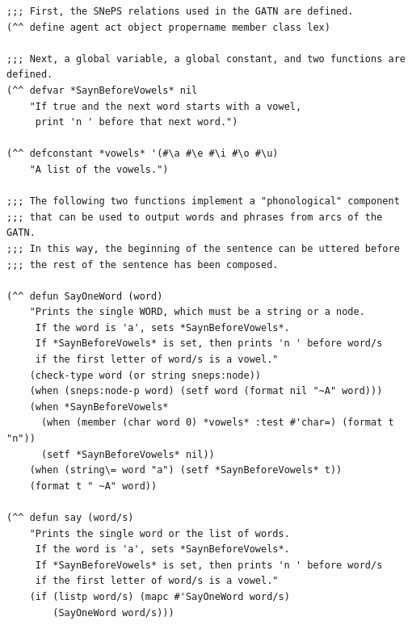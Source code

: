 \documentclass{book}
\begin{document}
\begin{verbatim}
;;; First, the SNePS relations used in the GATN are defined.
(^^ define agent act object propername member class lex)

;;; Next, a global variable, a global constant, and two functions are defined.
(^^ defvar *SaynBeforeVowels* nil
    "If true and the next word starts with a vowel,
     print 'n ' before that next word.")

(^^ defconstant *vowels* '(#\a #\e #\i #\o #\u)
    "A list of the vowels.")

;;; The following two functions implement a "phonological" component
;;; that can be used to output words and phrases from arcs of the GATN.
;;; In this way, the beginning of the sentence can be uttered before
;;; the rest of the sentence has been composed.

(^^ defun SayOneWord (word)
    "Prints the single WORD, which must be a string or a node.
     If the word is 'a', sets *SaynBeforeVowels*.
     If *SaynBeforeVowels* is set, then prints 'n ' before word/s
     if the first letter of word/s is a vowel."
    (check-type word (or string sneps:node))
    (when (sneps:node-p word) (setf word (format nil "~A" word)))
    (when *SaynBeforeVowels*
      (when (member (char word 0) *vowels* :test #'char=) (format t "n"))
      (setf *SaynBeforeVowels* nil))
    (when (string\= word "a") (setf *SaynBeforeVowels* t))
    (format t " ~A" word))

(^^ defun say (word/s)
    "Prints the single word or the list of words.
     If the word is 'a', sets *SaynBeforeVowels*.
     If *SaynBeforeVowels* is set, then prints 'n ' before word/s
     if the first letter of word/s is a vowel."
    (if (listp word/s) (mapc #'SayOneWord word/s)
        (SayOneWord word/s)))


\end{verbatim}
\end{document}
